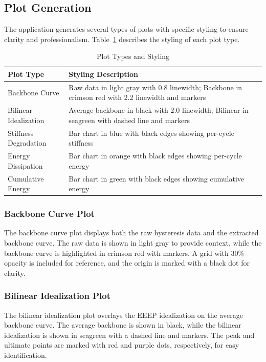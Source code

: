 \documentclass[11pt,a4paper]{article}
\begin{document}
\subsection{Plot Generation}

The application generates several types of plots with specific styling to ensure clarity and professionalism. Table~\ref{tab:plot_styles} describes the styling of each plot type.

\begin{table}[h]
\centering
\caption{Plot Types and Styling}\label{tab:plot_styles}
\begin{tabular}{p{4cm}p{10cm}}
\toprule
\textbf{Plot Type} & \textbf{Styling Description} \\
\midrule
Backbone Curve & Raw data in light gray with 0.8 linewidth; Backbone in crimson red with 2.2 linewidth and markers \\
Bilinear Idealization & Average backbone in black with 2.0 linewidth; Bilinear in seagreen with dashed line and markers \\
Stiffness Degradation & Bar chart in blue with black edges showing per-cycle stiffness \\
Energy Dissipation & Bar chart in orange with black edges showing per-cycle energy \\
Cumulative Energy & Bar chart in green with black edges showing cumulative energy \\
\bottomrule
\end{tabular}
\end{table}

\subsubsection{Backbone Curve Plot}

The backbone curve plot displays both the raw hysteresis data and the extracted backbone curve. The raw data is shown in light gray to provide context, while the backbone curve is highlighted in crimson red with markers. A grid with 30\% opacity is included for reference, and the origin is marked with a black dot for clarity.

\subsubsection{Bilinear Idealization Plot}

The bilinear idealization plot overlays the EEEP idealization on the average backbone curve. The average backbone is shown in black, while the bilinear idealization is shown in seagreen with a dashed line and markers. The peak and ultimate points are marked with red and purple dots, respectively, for easy identification.
\end{document}
